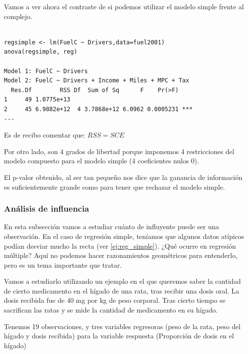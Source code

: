 \begin{example}
Vamos a ver ahora el contraste de si podemos utilizar el modelo simple frente al complejo.

\begin{lstlisting}[style=mystyle]

regsimple <- lm(FuelC ~ Drivers,data=fuel2001)
anova(regsimple, reg)

Model 1: FuelC ~ Drivers
Model 2: FuelC ~ Drivers + Income + Miles + MPC + Tax
  Res.Df        RSS Df  Sum of Sq      F    Pr(>F)
1     49 1.0775e+13
2     45 6.9882e+12  4 3.7868e+12 6.0962 0.0005231 ***
---
\end{lstlisting}

Es de recibo comentar que: $RSS = SCE$

Por otro lado, son 4 grados de libertad porque imponemos 4 restricciones del modelo compuesto para el modelo simple (4 coeficientes nulos 0).


El p-valor obtenido, al ser tan pequeño nos dice que la ganancia de información es suficientemente grande como para tener que rechazar el modelo simple.

\end{example}

\subsubsection{Análisis de influencia}

En esta subsección vamos a estudiar cuánto de influyente puede ser una observación. En el caso de regresión simple, teníamos que algunos datos atípicos podían desviar mucho la recta (ver \ref{ej:reg_simple}). ¿Qué ocurre en regresión múltiple? Aquí no podemos hacer razonamientos geométricos para entenderlo, pero es un tema importante que tratar.


Vamos a estudiarlo utilizando un ejemplo en el que queremos saber la cantidad de cierto medicamento en el hígado de una rata, tras recibir una dosis oral. La dosis recibida fue de 40 mg por kg de peso corporal. Tras cierto tiempo se sacrifican las ratas y se mide la cantidad de medicamento en su hígado.

Tenemos 19 observaciones, y tres variables regresoras (peso de la rata, peso del hígado y dosis recibida) para la variable respuesta (Proporción de dosis en el hígado)


